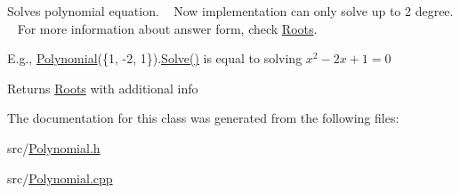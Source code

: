 Solves polynomial equation. ~\newline
 Now implementation can only solve up to 2 degree. ~\newline
 For more information about answer form, check \mbox{\hyperlink{struct_roots}{Roots}}.

E.\+g., \mbox{\hyperlink{class_polynomial}{Polynomial}}(\{1, -\/2, 1\}).\mbox{\hyperlink{class_polynomial_ac1a8732edb10e52f5ff4bba6aee83593}{Solve()}} is equal to solving $ x^2 - 2x + 1 = 0 $

\begin{DoxyReturn}{Returns}
\mbox{\hyperlink{struct_roots}{Roots}} with additional info 
\end{DoxyReturn}


The documentation for this class was generated from the following files\+:\begin{DoxyCompactItemize}
\item 
src/\mbox{\hyperlink{_polynomial_8h}{Polynomial.\+h}}\item 
src/\mbox{\hyperlink{_polynomial_8cpp}{Polynomial.\+cpp}}\end{DoxyCompactItemize}
